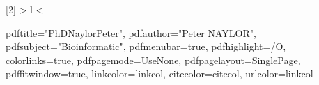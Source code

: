 \usepackage[mathscr]{eucal}
\usepackage{textcomp}


\newenvironment{theabstract}[1]%
{\markboth{#1}{#1}%
{\large\noindent\rule{1ex}{1ex}\hspace{\stretch{1}}%
{\textbf{\textit{#1}}}%
\hspace{\stretch{1}}\rule{1ex}{1ex}}
\addcontentsline{toc}{chapter}{#1} \adjustmtc
\vskip 0.2in
\begin{large}}%
{\end{large}}



\newcolumntype{R}[2]{%
    >{\bgroup}%
    l%
    <{\egroup}%
}
\newcommand*\rot{\multicolumn{1}{R{70}{1em}}}%




\usepackage{hyperref}
\hypersetup
{
pdftitle="PhDNaylorPeter",
pdfauthor="Peter NAYLOR", %
pdfsubject="Bioinformatic", %
pdfmenubar=true, %
pdfhighlight=/O, %
colorlinks=true, %
pdfpagemode=UseNone, %
pdfpagelayout=SinglePage, %
pdffitwindow=true, %
linkcolor=linkcol, %
citecolor=citecol, %
urlcolor=linkcol %
}


